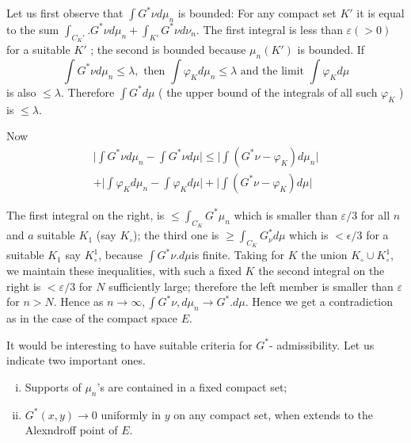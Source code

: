 Let us first observe that $\int G^* \nu d\mu _n $ is bounded: For any
compact set $K'$ it is equal to the sum $\int_{C_K'}. G^* \nu d \mu_n+ \int_{K'}
G^* \nu d \nu _n $.  The first integral is less than $\varepsilon (>
0)$ for a suitable $K'$ ; the second is bounded because $\mu _n (K')$
is bounded. If  
$$
\int G^* \nu d \mu _n\leq \lambda, \text{ then } \int \varphi _K d \mu
_n \leq \lambda \text{ and the limit } \int \varphi _K d \mu   
$$
is also $\leq \lambda$. Therefore $\int G^* d \mu$ ( the upper bound
of the integrals of all such $\varphi _K$ ) is $\leq \lambda$.  

Now
\begin{multline*}
  \big|  \int G^*\nu d \mu _n - \int G^* \nu d \mu \big|
  \leq \big|  \int (G^*\nu- \varphi _K) d \mu _n \big|\\  
  + \big| \int
  \varphi _K d \mu _n - \int \varphi_K d \mu \big|
  +\big|   \int (G ^* \nu - \varphi _K) d \mu \big| 
\end{multline*}

The first integral on the right, is $\leq  \int_{ C_K} G^* \mu _n $
which is smaller than $\varepsilon / 3$ for all $n$ and $a$ suitable
$K_1$ (say $K_\circ$); the third one is $\geq \int_{C_K} G^*_\nu d
\mu$ which is $< \epsilon/3$ for a suitable $K_1$ say $K^1_\circ$,
because $\int G^* \nu.  d \mu $\pageoriginale is 
finite. Taking for $K$  the union $K_\circ \cup K^1_\circ$, we
maintain these inequalities, with such a fixed $K$ the second integral
on the right is $< 
\varepsilon / 3$ for $N$ sufficiently large; therefore the left member
is smaller than $\varepsilon$ for $n > N$. Hence as $n \to \infty,
\int G^* \nu, d \mu _n \to G^*.  d \mu $. Hence we get a contradiction
as in the case of the compact space $E$.  

\begin{remark*}
  It would be interesting to have suitable criteria for $G^*$-
  admissibility. Let us indicate two important ones.  
  \begin{enumerate} [(i)]
  \item Supports of $\mu _n$'s are contained in a fixed compact set; 
  \item $G^* ( x, y ) \to 0 $ uniformly in $y$ on any compact set,
    when extends to the Alexndroff point of $E$.  
  \end{enumerate}
\end{remark*}
